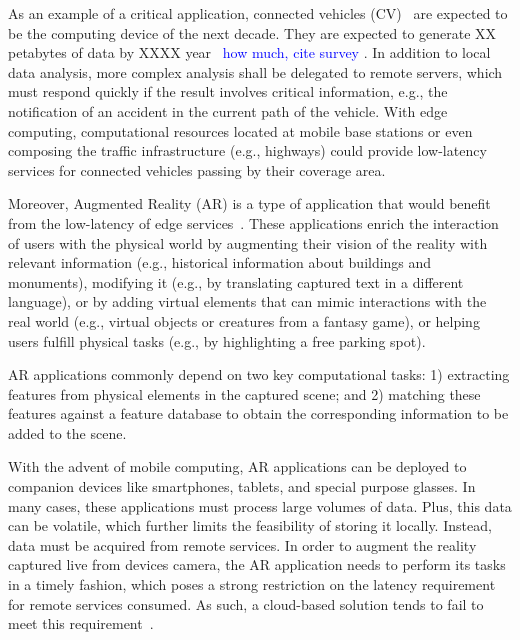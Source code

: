As an example of a critical application, connected vehicles (CV)~\cite{Bonomi:2012} are expected to be the computing device of the next decade. They are expected to generate XX petabytes of data by XXXX year~\cite{connectedCars} \textcolor{blue}{how much, cite survey}
. In addition to local data analysis, more complex analysis shall be delegated to remote servers, which must respond quickly if the result involves critical information, e.g., the notification of an accident in the current path of the vehicle. With edge computing, computational resources located at mobile base stations or even composing the traffic infrastructure (e.g., highways) could provide low-latency services for connected vehicles passing by their coverage area.

Moreover, Augmented Reality (AR) is a type of application that would benefit from the low-latency of edge services~\cite{hu2015mobile,GarrigaMendonca2017}. These applications enrich the interaction of users with the physical
world by augmenting their vision of the reality with relevant information (e.g., historical information about buildings and monuments), modifying it (e.g., by translating captured text in a different language), or by adding virtual elements that can mimic interactions with the real world (e.g., virtual objects or creatures
from a fantasy game), or helping users fulfill physical tasks (e.g., by highlighting a free parking spot).

AR applications commonly depend on two key computational tasks: 1) extracting features from physical elements in the captured scene; and 2) matching these features against a feature database to obtain the corresponding information to be added to the scene. 

With the advent of mobile computing, AR applications can be deployed to companion devices like smartphones, tablets, and special purpose glasses. In many cases, these applications must process large volumes of data. Plus, this data can be volatile, which further limits the feasibility of storing it locally. Instead, data must be acquired from remote services. In order to augment the reality captured live from devices camera, the AR application needs to perform its tasks in a timely fashion, which poses a strong restriction on the latency requirement for remote services consumed. As such, a cloud-based solution tends to fail to meet this requirement~\cite{ServerlessEdgeESOCC17}. 


